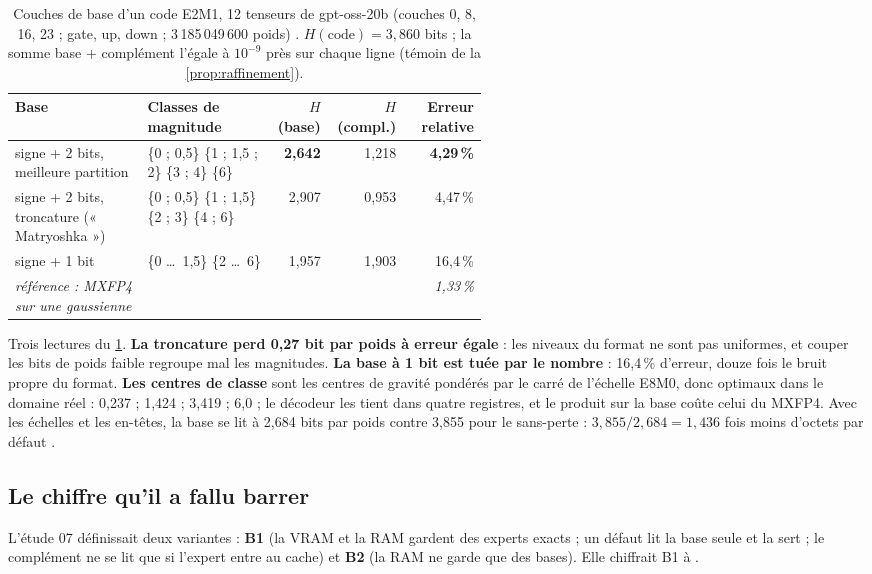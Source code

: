 \begin{table}[ht]
\centering\small
\caption[Couches de base d'un code E2M1]{Couches de base d'un code E2M1, 12 tenseurs de gpt-oss-20b (couches 0, 8, 16, 23 ; gate, up, down ; 3\,185\,049\,600 poids) \mes. $H(\text{code}) = 3{,}860$ bits ; la somme base + complément l'égale à $10^{-9}$ près sur chaque ligne (témoin de la \cref{prop:raffinement}).}
\label{tab:bases}
\begin{tabular}{@{}p{0.28\linewidth}p{0.27\linewidth}rrr@{}}
\toprule
Base & Classes de magnitude & $H$(base) & $H$(compl.) & Erreur relative \\
\midrule
signe + 2 bits, meilleure partition & \{0 ; 0,5\} \{1 ; 1,5 ; 2\} \{3 ; 4\} \{6\} & \textbf{2,642} & 1,218 & \textbf{4,29\,\%} \\
signe + 2 bits, troncature (« Matryoshka ») & \{0 ; 0,5\} \{1 ; 1,5\} \{2 ; 3\} \{4 ; 6\} & 2,907 & 0,953 & 4,47\,\% \\
signe + 1 bit & \{0 \ldots\ 1,5\} \{2 \ldots\ 6\} & 1,957 & 1,903 & 16,4\,\% \\
\emph{référence : MXFP4 sur une gaussienne} & & & & \emph{1,33\,\%} \\
\bottomrule
\end{tabular}
\end{table}

Trois lectures du \cref{tab:bases}. \textbf{La troncature perd 0,27 bit par poids à erreur égale} : les niveaux du format ne sont pas uniformes, et couper les bits de poids faible regroupe mal les magnitudes. \textbf{La base à 1 bit est tuée par le nombre} : 16,4\,\% d'erreur, douze fois le bruit propre du format. \textbf{Les centres de classe} sont les centres de gravité pondérés par le carré de l'échelle E8M0, donc optimaux dans le domaine réel : 0,237 ; 1,424 ; 3,419 ; 6,0 ; le décodeur les tient dans quatre registres, et le produit sur la base coûte celui du MXFP4. Avec les échelles et les en-têtes, la base se lit à 2,684 bits par poids contre 3,855 pour le sans-perte : $3{,}855/2{,}684 = 1{,}436$ fois moins d'octets par défaut \calc.

\subsection{Le chiffre qu'il a fallu barrer}\label{sec:correction-b1}

L'étude 07 définissait deux variantes : \textbf{B1} (la VRAM et la RAM gardent des experts exacts ; un défaut lit la base seule et la sert ; le complément ne se lit que si l'expert entre au cache) et \textbf{B2} (la RAM ne garde que des bases). Elle chiffrait B1 à .


